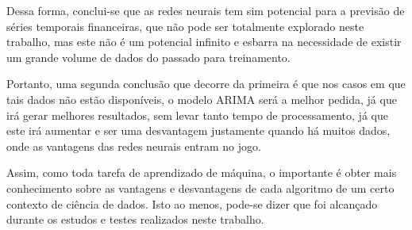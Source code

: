 Dessa forma, conclui-se que as redes neurais tem sim potencial para a previsão de séries temporais financeiras, que não pode ser totalmente explorado neste trabalho, mas este não é um potencial infinito e esbarra na necessidade de existir um grande volume de dados do passado para treinamento.

Portanto, uma segunda conclusão que decorre da primeira é que nos casos em que tais dados não estão disponíveis, o modelo ARIMA será a melhor pedida, já que irá gerar melhores resultados, sem levar tanto tempo de processamento, já que este irá aumentar e ser uma desvantagem justamente quando há muitos dados, onde as vantagens das redes neurais entram no jogo.

Assim, como toda tarefa de aprendizado de máquina, o importante é obter mais conhecimento sobre as vantagens e desvantagens de cada algoritmo de um certo contexto de ciência de dados. Isto ao menos, pode-se dizer que foi alcançado durante os estudos e testes realizados neste trabalho.